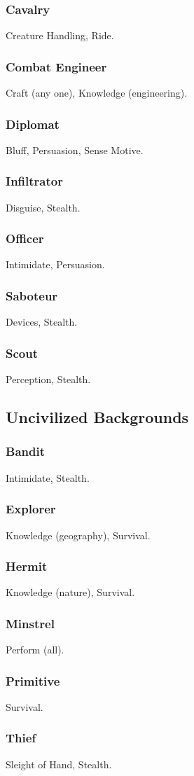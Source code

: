 \subsubsection{Cavalry}
 Creature Handling, Ride.

\subsubsection{Combat Engineer}
 Craft (any one), Knowledge (engineering).

\subsubsection{Diplomat}
 Bluff, Persuasion, Sense Motive.

\subsubsection{Infiltrator}
 Disguise, Stealth.

\subsubsection{Officer}
 Intimidate, Persuasion.

\subsubsection{Saboteur}
 Devices, Stealth.

\subsubsection{Scout}
 Perception, Stealth.

\subsection{Uncivilized Backgrounds}

\subsubsection{Bandit}
 Intimidate, Stealth.

\subsubsection{Explorer}
 Knowledge (geography), Survival.

\subsubsection{Hermit}
 Knowledge (nature), Survival.

\subsubsection{Minstrel}
 Perform (all).

\subsubsection{Primitive}
 Survival.

\subsubsection{Thief}
 Sleight of Hand, Stealth.

